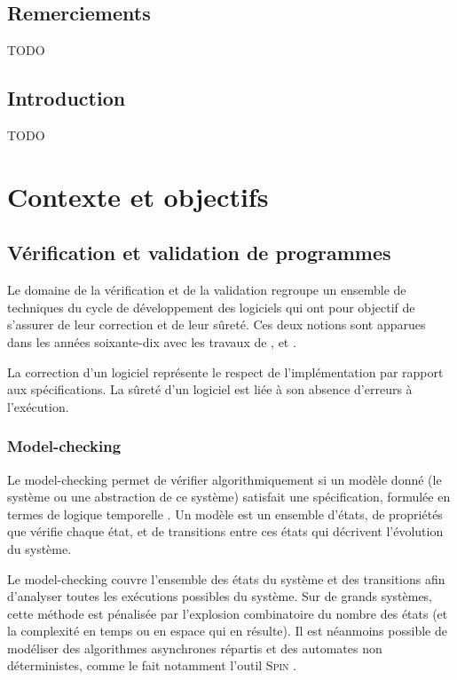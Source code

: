 \documentclass[french]{spimufcphdthesis}
\begin{document}
\chapter*{Remerciements}

TODO


\tableofcontents
\mainmatter


\chapter*{Introduction}

TODO


\part{Contexte et objectifs}


\chapter{Vérification et validation de programmes}


Le domaine de la vérification et de la validation regroupe un ensemble de
techniques du cycle de développement des logiciels qui ont pour objectif de
s'assurer de leur correction et de leur sûreté. Ces deux notions sont apparues
dans les années soixante-dix avec les travaux de  \cite{Dijkstra},
 \cite{Floyd} et  \cite{Hoare}.

La correction d'un logiciel représente le respect de l'implémentation par
rapport aux spécifications. La sûreté d'un logiciel est liée à son absence
d'erreurs à l'exécution.


\section{Model-checking}
\label{sec:model-checking}

Le model-checking \cite{model-checking} permet de vérifier algorithmiquement si
un modèle donné (le système ou une abstraction de ce système) satisfait une
spécification, formulée en termes de logique temporelle \cite{LTL}. Un modèle
est un ensemble d'états, de propriétés que vérifie chaque état, et de
transitions entre ces états qui décrivent l'évolution du système.

Le model-checking couvre l'ensemble des états du système et des transitions afin
d'analyser toutes les exécutions possibles du système. Sur de grands systèmes,
cette méthode est pénalisée par l'explosion combinatoire du nombre des états (et
la complexité en temps ou en espace qui en résulte). Il est néanmoins possible
de modéliser des algorithmes asynchrones répartis et des automates non
déterministes, comme le fait notamment l'outil \textsc{Spin} \cite{SPIN}.
\end{document}
